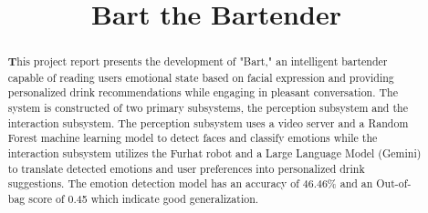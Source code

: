 \documentclass[conference]{IEEEtran}
\begin{document}
\title{Bart the Bartender\\
}

\author{
\and
{}

\and
{}
\and
{}

}

\maketitle


\begin{abstract}
\textbf This project report presents the development of "Bart," an intelligent bartender capable of reading users emotional state based on facial expression and providing personalized drink recommendations while engaging in pleasant conversation. The system is constructed of two primary subsystems, the perception subsystem and the interaction subsystem. The perception subsystem uses a video server and a Random Forest machine learning model to detect faces and classify emotions while the interaction subsystem utilizes the Furhat robot and a Large Language Model (Gemini) to translate detected emotions and user preferences into personalized drink suggestions. The emotion detection model has an accuracy of 46.46\% and an Out-of-bag score of 0.45 which indicate good generalization.\\ 
\end{abstract}
\end{document}
